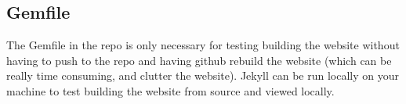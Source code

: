 \documentclass[landscape, twocolumn, 12pt]{article}
\begin{document}
\subsection{Gemfile}
The Gemfile in the repo is only necessary for testing building the website without having to push to the repo and having github rebuild the website (which can be really time consuming, and clutter the website). Jekyll can be run locally on your machine to test building the website from source and viewed locally.






%
%
\end{document}
